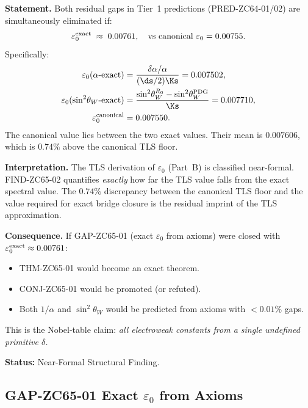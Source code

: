 \documentclass[12pt, a4paper]{article}
\renewcommand{\swsq}{\sin^2\!\theta_W}
\begin{document}
\begin{derivedbox}[title={FIND-ZC65-02: Both Gaps Point to
  $\varepsilon_0^{\rm exact} \approx 0.00761$ (Structural)}]
\textbf{Statement.}
Both residual gaps in Tier~1 predictions (PRED-ZC64-01/02)
are simultaneously eliminated if:
\[
  \varepsilon_0^{\rm exact} \;\approx\; 0.00761,
  \quad\text{vs canonical }\varepsilon_0 = 0.00755.
\]
Specifically:
\begin{align*}
  \varepsilon_0(\alpha\text{-exact})
  &= \frac{\delta\alpha/\alpha}{(\ds/2)\Ks} = 0.007502, \\
  \varepsilon_0(\swsq\text{-exact})
  &= \frac{\swsq^{R_0}-\swsq^{\rm PDG}}{\Ks} = 0.007710, \\
  \varepsilon_0^{\rm canonical} &= 0.007550. \\
\end{align*}
The canonical value lies between the two exact values.
Their mean is $0.007606$, which is $0.74\%$ above
the canonical TLS floor.

\textbf{Interpretation.}
The TLS derivation of $\varepsilon_0$ (Part~B) is
classified near-formal.
FIND-ZC65-02 quantifies \emph{exactly} how far the
TLS value falls from the exact spectral value.
The $0.74\%$ discrepancy between the canonical TLS
floor and the value required for exact bridge closure
is the residual imprint of the TLS approximation.

\textbf{Consequence.}
If GAP-ZC65-01 (exact $\varepsilon_0$ from axioms)
were closed with $\varepsilon_0^{\rm exact} \approx 0.00761$:
\begin{itemize}[leftmargin=2em, noitemsep]
  \item THM-ZC65-01 would become an exact theorem.
  \item CONJ-ZC65-01 would be promoted (or refuted).
  \item Both $1/\alpha$ and $\swsq$ would be predicted
    from axioms with $<0.01\%$ gaps.
\end{itemize}
This is the Nobel-table claim:
\emph{all electroweak constants from a single undefined primitive $\delta$.}

\textbf{Status:} Near-Formal Structural Finding.
\end{derivedbox}

\subsection{GAP-ZC65-01 \quad Exact $\varepsilon_0$ from Axioms}
\label{sec:gap}
\end{document}
